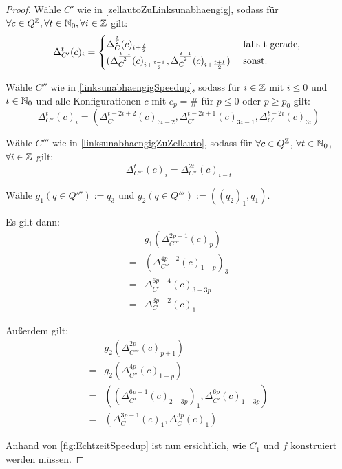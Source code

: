 \begin{proof}
    Wähle $C'$ wie in \cref{zellautoZuLinksunabhaengig}, sodass
    für $\forall c \in Q^{\mathbb{Z}}, \forall t \in \mathbb{N}_0, \forall i \in \mathbb{Z}$ gilt:
    \[
        \Delta_{C'}^{t}(c)_i =
        \begin{cases}
            \Delta_C^{\frac{t}{2}}(c)_{i+\frac{t}{2}} & \text{ falls } $t$ \text{ gerade, } \\
            (\Delta_C^{\frac{t - 1}{2}}(c)_{i+\frac{t - 1}{2}}, \Delta_C^{\frac{t-1}{2}}(c)_{i+\frac{t+1}{2}})  & \text{ sonst.}
        \end{cases}
    \]
    
    Wähle $C''$ wie in \cref{linksunabhaengigSpeedup}, sodass für $i \in \mathbb{Z}$ mit $i \leq 0$ und $t \in \mathbb{N}_0$
    und alle Konfigurationen $c$ mit $c_p = \#$ für $p \leq 0$ oder $p \geq p_0$ gilt:
    \[
        \Delta^{t}_{C''}(c)_i = ( \Delta^{t-2i+2}_{C'}(c)_{3i-2},
        \Delta^{t-2i+1}_{C'}(c)_{3i-1},
        \Delta^{t-2i}_{C'}(c)_{3i}
        )
    \]
    
    Wähle $C'''$ wie in \cref{linksunabhaengigZuZellauto}, sodass für $\forall c \in Q^{\mathbb{Z}}$,
    $\forall t \in \mathbb{N}_0$, $\forall i \in \mathbb{Z}$ gilt:
    \[
        \Delta^t_{C'''}(c)_{i} = \Delta^{2t}_{C''}(c)_{i-t}
    \]
    
    Wähle $g_1(q \in Q''') := q_3$ und $g_2(q \in Q''') := ((q_2)_1, q_1)$.
    
    Es gilt dann:
    \begin{align*}
          & g_1(\Delta_{C'''}^{2p-1}(c)_p) \\
        = & (\Delta_{C''}^{4p-2}(c)_{1-p})_3 \\
        = & \Delta_{C'}^{6p-4}(c)_{3-3p} \\
        = & \Delta_{C}^{3p-2}(c)_1
    \end{align*}
    
    Außerdem gilt:
    \begin{align*}
          & g_2(\Delta_{C'''}^{2p}(c)_{p+1}) \\
        = & g_2(\Delta_{C''}^{4p}(c)_{1-p}) \\
        = & ((\Delta_{C'}^{6p-1}(c)_{2-3p})_1, \Delta_{C'}^{6p}(c)_{1-3p}) \\
        = & (\Delta_C^{3p-1}(c)_1, \Delta_C^{3p}(c)_1)
    \end{align*}

    Anhand von \cref{fig:EchtzeitSpeedup} ist nun ersichtlich, wie $C_1$ und $f$ konstruiert werden müssen.
\end{proof}

